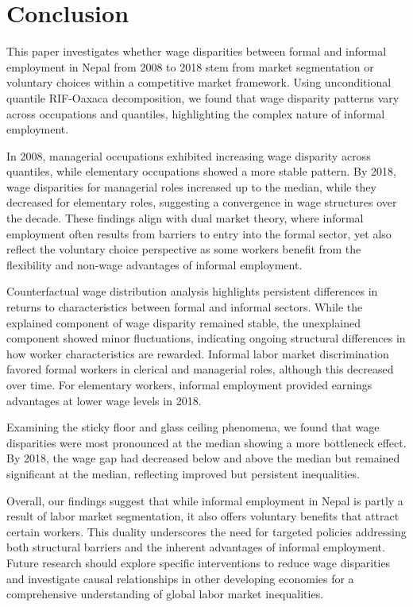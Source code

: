 \section{Conclusion}

This paper investigates whether wage disparities between formal and informal employment in Nepal from 2008 to 2018 stem from market segmentation or voluntary choices within a competitive market framework. Using unconditional quantile RIF-Oaxaca decomposition, we found that wage disparity patterns vary across occupations and quantiles, highlighting the complex nature of informal employment.

In 2008, managerial occupations exhibited increasing wage disparity across quantiles, while elementary occupations showed a more stable pattern. By 2018, wage disparities for managerial roles increased up to the median, while they decreased for elementary roles, suggesting a convergence in wage structures over the decade. These findings align with dual market theory, where informal employment often results from barriers to entry into the formal sector, yet also reflect the voluntary choice perspective as some workers benefit from the flexibility and non-wage advantages of informal employment.

Counterfactual wage distribution analysis highlights persistent differences in returns to characteristics between formal and informal sectors. While the explained component of wage disparity remained stable, the unexplained component showed minor fluctuations, indicating ongoing structural differences in how worker characteristics are rewarded. Informal labor market discrimination favored formal workers in clerical and managerial roles, although this decreased over time. For elementary workers, informal employment provided earnings advantages at lower wage levels in 2018.

Examining the sticky floor and glass ceiling phenomena, we found that wage disparities were most pronounced at the median showing a more bottleneck effect. By 2018, the wage gap had decreased below and above the median but remained significant at the median, reflecting improved but persistent inequalities.

Overall, our findings suggest that while informal employment in Nepal is partly a result of labor market segmentation, it also offers voluntary benefits that attract certain workers. This duality underscores the need for targeted policies addressing both structural barriers and the inherent advantages of informal employment. Future research should explore specific interventions to reduce wage disparities and investigate causal relationships in other developing economies for a comprehensive understanding of global labor market inequalities.